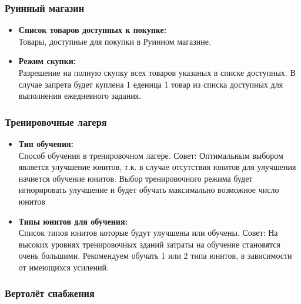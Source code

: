 \documentclass[
]{article}
\begin{document}
\subsubsection{Руинный
магазин}\label{ux440ux443ux438ux43dux43dux44bux439-ux43cux430ux433ux430ux437ux438ux43d}

\begin{itemize}
\item
  \textbf{Список товаров доступных к покупке:}\\
  Товары, доступные для покупки в Руинном магазине.
\item
  \textbf{Режим скупки:}\\
  Разрешение на полную скупку всех товаров указаных в списке доступных.
  В случае запрета будет куплена 1 еденица 1 товар из списка доступных
  для выполнения ежедневного задания.
\end{itemize}

\subsubsection{Тренировочные
лагеря}\label{ux442ux440ux435ux43dux438ux440ux43eux432ux43eux447ux43dux44bux435-ux43bux430ux433ux435ux440ux44f-1}

\begin{itemize}
\item
  \textbf{Тип обучения:}\\
  Способ обучения в тренировочном лагере. Совет: Оптимальным выбором
  является улучшение юнитов, т.к. в случае отсутствия юнитов для
  улучшения начнется обучение юнитов. Выбор тренировочного режима будет
  игнорировать улучшение и будет обучать максимально возможное число
  юнитов
\item
  \textbf{Типы юнитов для обучения:}\\
  Список типов юнитов которые будут улучшены или обучены. Совет: На
  высоких уровнях тренировочных зданий затраты на обучение становятся
  очень большими. Рекомендуем обучать 1 или 2 типа юнитов, в зависимости
  от имеющихся усилений.
\end{itemize}

\subsubsection{Вертолёт
снабжения}\label{ux432ux435ux440ux442ux43eux43bux451ux442-ux441ux43dux430ux431ux436ux435ux43dux438ux44f}
\end{document}
